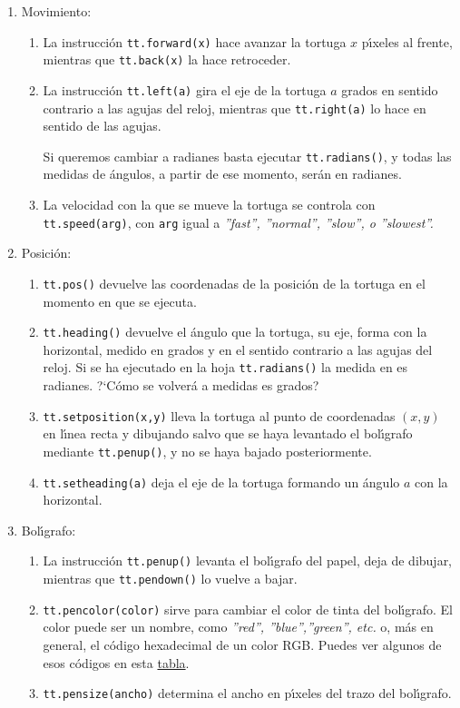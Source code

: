 \begin{appendices}
\begin{enumerate}
\item {\sc Movimiento:}
\begin{enumerate}
\item La instrucci\'on \lstinline|tt.forward(x)| hace avanzar la tortuga $x$
 p\'{\i}xeles al frente, mientras que  \lstinline|tt.back(x)| la hace
retroceder. 

\item  La instrucci\'on  \lstinline|tt.left(a)| gira el eje de la tortuga $a$
grados en sentido contrario a las agujas del reloj, mientras que 
\lstinline|tt.right(a)| lo hace en sentido de las agujas.

Si queremos cambiar a radianes basta ejecutar \lstinline|tt.radians()|, y 
todas las medidas de \'angulos, a partir de ese momento, ser\'an en radianes.

\item La velocidad con la que se mueve la tortuga se controla con
\lstinline|tt.speed(arg)|, con {\tt arg} igual a {\itshape ''fast'', ''normal'',
''slow'', o ''slowest''.} 
\end{enumerate}

\item {\sc Posici\'on:}
\begin{enumerate}
 \item \lstinline|tt.pos()| devuelve las coordenadas de la posici\'on de la
tortuga en el momento en que se ejecuta.
 \item \lstinline|tt.heading()| devuelve el \'angulo que la tortuga, su eje,
forma con la horizontal, medido en grados y  en el sentido contrario a las
agujas del reloj. Si se ha ejecutado en la hoja \lstinline|tt.radians()| la
medida en es radianes. ?`C\'omo se volver\'a a medidas es grados?
\item \lstinline|tt.setposition(x,y)| lleva la tortuga al punto de coordenadas
$(x,y)$ en l\'{\i}nea recta y dibujando salvo que se haya levantado el
bol\'{\i}grafo mediante 
\lstinline|tt.penup()|, y no se haya bajado posteriormente.
\item \lstinline|tt.setheading(a)| deja el eje de la tortuga formando un
\'angulo $a$ con la horizontal. 
\end{enumerate}





\item {\sc Bol\'{\i}grafo:}
\begin{enumerate}
\item La instrucci\'on  \lstinline|tt.penup()| levanta el bol\'{\i}grafo del
papel, deja de dibujar, mientras que \lstinline|tt.pendown()| lo vuelve a bajar.
\item \lstinline|tt.pencolor(color)| sirve para cambiar el color de tinta del
bol\'{\i}grafo. El color puede ser un nombre, como {\itshape ''red'',
''blue'',''green'', etc.} o, m\'as en general, el c\'odigo hexadecimal de un
color RGB. Puedes ver algunos de esos c\'odigos en esta  
\href{http://www.rapidtables.com/web/color/RGB_Color.htm}{tabla}.
\item \lstinline|tt.pensize(ancho)| determina el ancho en p\'{\i}xeles del trazo
del bol\'{\i}grafo. 




\end{enumerate}
\end{enumerate}
\end{appendices}
